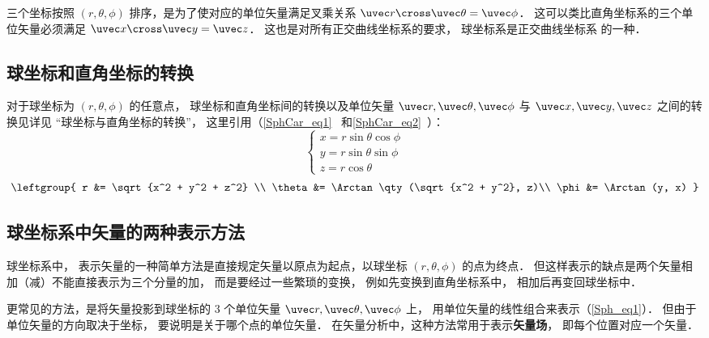 三个坐标按照 $(r, \theta , \phi )$ 排序，是为了使对应的单位矢量满足叉乘关系 $\uvec r \cross \uvec \theta  = \uvec \phi $． 这可以类比直角坐标系的三个单位矢量必须满足 $\uvec x \cross \uvec y = \uvec z$． 这也是对所有正交曲线坐标系的要求， 球坐标系是正交曲线坐标系 的一种．

\subsection{球坐标和直角坐标的转换}
对于球坐标为 $(r, \theta , \phi )$ 的任意点， 球坐标和直角坐标间的转换以及单位矢量 $\uvec r, \uvec \theta, \uvec \phi$  与 $\uvec x, \uvec y, \uvec z$ 之间的转换见详见 “球坐标与直角坐标的转换”， 这里引用（\autoref{SphCar_eq1}~ 和\autoref{SphCar_eq2}~）：
\begin{equation}
\begin{cases}
x = r\sin \theta \cos \phi \\
y = r\sin \theta \sin \phi \\
z = r\cos \theta 
\end{cases}
\end{equation}
\begin{equation}
\leftgroup{
r &= \sqrt {x^2 + y^2 + z^2} \\
\theta  &= \Arctan\qty(\sqrt{x^2 + y^2}, z)\\
\phi  &= \Arctan(y, x)
}\end{equation}


 
\subsection{球坐标系中矢量的两种表示方法}
球坐标系中， 表示矢量的一种简单方法是直接规定矢量以原点为起点，以球坐标 $(r, \theta, \phi)$ 的点为终点． 但这样表示的缺点是两个矢量相加（减）不能直接表示为三个分量的加， 而是要经过一些繁琐的变换， 例如先变换到直角坐标系中， 相加后再变回球坐标中．

更常见的方法，是将矢量投影到球坐标的 3 个单位矢量 $\uvec r, \uvec \theta, \uvec \phi$ 上， 用单位矢量的线性组合来表示（\autoref{Sph_eq1}）． 但由于单位矢量的方向取决于坐标， 要说明是关于哪个点的单位矢量． 在矢量分析中，这种方法常用于表示\textbf{矢量场}， 即每个位置对应一个矢量．

